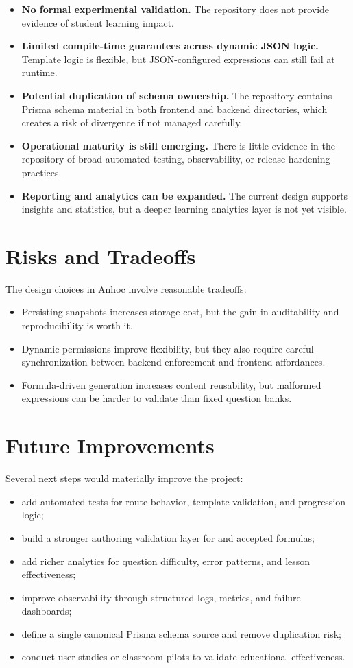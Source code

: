 \begin{itemize}
  \item \textbf{No formal experimental validation.} The repository does not provide evidence of student learning impact.
  \item \textbf{Limited compile-time guarantees across dynamic JSON logic.} Template logic is flexible, but JSON-configured expressions can still fail at runtime.
  \item \textbf{Potential duplication of schema ownership.} The repository contains Prisma schema material in both frontend and backend directories, which creates a risk of divergence if not managed carefully.
  \item \textbf{Operational maturity is still emerging.} There is little evidence in the repository of broad automated testing, observability, or release-hardening practices.
  \item \textbf{Reporting and analytics can be expanded.} The current design supports insights and statistics, but a deeper learning analytics layer is not yet visible.
\end{itemize}

\section{Risks and Tradeoffs}

The design choices in Anhoc involve reasonable tradeoffs:
\begin{itemize}
  \item Persisting snapshots increases storage cost, but the gain in auditability and reproducibility is worth it.
  \item Dynamic permissions improve flexibility, but they also require careful synchronization between backend enforcement and frontend affordances.
  \item Formula-driven generation increases content reusability, but malformed expressions can be harder to validate than fixed question banks.
\end{itemize}

\section{Future Improvements}

Several next steps would materially improve the project:
\begin{itemize}
  \item add automated tests for route behavior, template validation, and progression logic;
  \item build a stronger authoring validation layer for  and accepted formulas;
  \item add richer analytics for question difficulty, error patterns, and lesson effectiveness;
  \item improve observability through structured logs, metrics, and failure dashboards;
  \item define a single canonical Prisma schema source and remove duplication risk;
  \item conduct user studies or classroom pilots to validate educational effectiveness.
\end{itemize}


